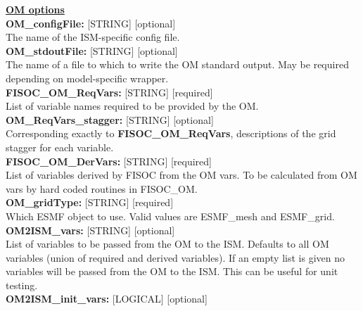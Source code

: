 \documentclass[12pt]{article}
\begin{document}
\begin{flushleft}
\textbf{\underline{OM options}} \\
\vspace{6pt}
\textbf{OM\_configFile:}      [STRING] [optional]                          \\
The name of the ISM-specific config file.                                  \\
\vspace{6pt}
\textbf{OM\_stdoutFile:}     [STRING] [optional]                           \\
The name of a file to which to write the OM standard output.  May be 
required depending on model-specific wrapper.                              \\
\vspace{6pt}
\textbf{FISOC\_OM\_ReqVars:}  [STRING] [required]                          \\
List of variable names required to be provided by the OM.                  \\
\vspace{6pt}
\textbf{OM\_ReqVars\_stagger:} [STRING] [optional]                         \\
Corresponding exactly to \textbf{FISOC\_OM\_ReqVars}, descriptions of the 
grid stagger for each variable.                                            \\
\vspace{6pt}
\textbf{FISOC\_OM\_DerVars:}  [STRING] [required]                          \\
List of variables derived by FISOC from the OM vars.  
To be calculated from OM vars by hard coded routines in FISOC\_OM.        \\
\vspace{6pt}
\textbf{OM\_gridType:}        [STRING] [required]                           \\
Which ESMF object to use.  Valid values are ESMF\_mesh and ESMF\_grid.     \\
\vspace{6pt}
\textbf{OM2ISM\_vars:}        [STRING] [optional]                          \\
List of variables to be passed from the OM to the ISM. Defaults to 
all OM variables (union of required and derived variables). If an empty 
list is given no variables will be passed from the OM to the ISM.  This 
can be useful for unit testing.                                            \\ 
\vspace{6pt}
\textbf{OM2ISM\_init\_vars:}  [LOGICAL] [optional]                         \\

\end{flushleft}
\end{document}
